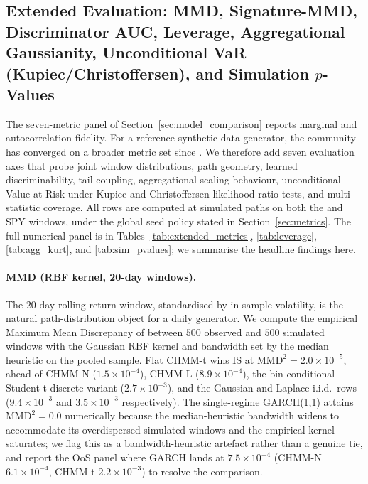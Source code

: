 \subsection{Extended Evaluation: MMD, Signature-MMD, Discriminator AUC, Leverage, Aggregational Gaussianity, Unconditional VaR (Kupiec/Christoffersen), and Simulation $p$-Values}
\label{sec:extended_evaluation}

The seven-metric panel of Section~\ref{sec:model_comparison} reports marginal and autocorrelation fidelity.
For a reference synthetic-data generator, the community has converged on a broader metric set since \citet{gretton2012kernel, chevyrev2016primer, yoon2019timegan, ni2020conditional}.
We therefore add seven evaluation axes that probe joint window distributions, path geometry, learned discriminability, tail coupling, aggregational scaling behaviour, unconditional Value-at-Risk under Kupiec and Christoffersen likelihood-ratio tests, and multi-statistic coverage.
All rows are computed at  simulated paths on both the  and  SPY windows, under the global seed policy stated in Section~\ref{sec:metrics}.
The full numerical panel is in Tables~\ref{tab:extended_metrics}, \ref{tab:leverage}, \ref{tab:agg_kurt}, and \ref{tab:sim_pvalues}; we summarise the headline findings here.

\paragraph{MMD (RBF kernel, 20-day windows).}
The $20$-day rolling return window, standardised by in-sample volatility, is the natural path-distribution object for a daily generator.
We compute the empirical Maximum Mean Discrepancy of \citet{gretton2012kernel} between $500$ observed and $500$ simulated windows with the Gaussian RBF kernel and bandwidth set by the median heuristic on the pooled sample.
Flat CHMM-t wins IS at $\text{MMD}^2 = 2.0 \times 10^{-5}$, ahead of CHMM-N ($1.5 \times 10^{-4}$), CHMM-L ($8.9 \times 10^{-4}$), the bin-conditional Student-t discrete variant ($2.7 \times 10^{-3}$), and the Gaussian and Laplace i.i.d.\ rows ($9.4 \times 10^{-3}$ and $3.5 \times 10^{-3}$ respectively).
The single-regime GARCH(1,1) attains $\text{MMD}^2 = 0.0$ numerically because the median-heuristic bandwidth widens to accommodate its overdispersed simulated windows and the empirical kernel saturates; we flag this as a bandwidth-heuristic artefact rather than a genuine tie, and report the OoS panel where GARCH lands at $7.5 \times 10^{-4}$ (CHMM-N $6.1 \times 10^{-4}$, CHMM-t $2.2 \times 10^{-3}$) to resolve the comparison.

